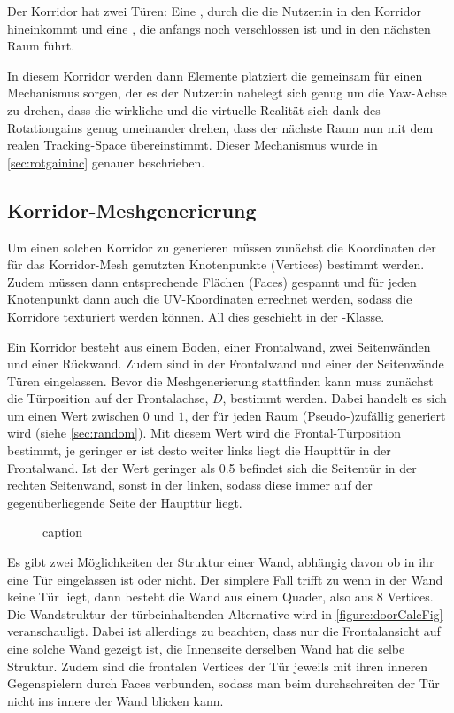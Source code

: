 Der Korridor hat zwei Türen: Eine , durch die die Nutzer:in in den Korridor hineinkommt und eine , die anfangs noch verschlossen ist und in den nächsten Raum führt. %

In diesem Korridor werden dann Elemente platziert die gemeinsam für einen Mechanismus sorgen, der es der Nutzer:in nahelegt sich genug um die Yaw-Achse zu drehen, dass die wirkliche und die virtuelle Realität sich dank des Rotationgains genug umeinander drehen, dass der nächste Raum nun mit dem realen Tracking-Space übereinstimmt. Dieser Mechanismus wurde in
\autoref{sec:rotgaininc}
genauer beschrieben.

\subsection{Korridor-Meshgenerierung}
\label{subsec:corridormesh}
Um einen solchen Korridor zu generieren müssen zunächst die Koordinaten der  für das Korridor-Mesh genutzten Knotenpunkte (Vertices) bestimmt werden. Zudem müssen dann entsprechende Flächen (Faces) gespannt und für jeden Knotenpunkt dann auch die UV-Koordinaten errechnet werden, sodass die Korridore texturiert werden können. All dies geschieht in der -Klasse.

Ein Korridor besteht aus einem Boden, einer Frontalwand, zwei Seitenwänden und einer Rückwand. Zudem sind in der Frontalwand und einer der Seitenwände Türen eingelassen.
Bevor die Meshgenerierung stattfinden kann muss zunächst die Türposition auf der Frontalachse, $D$, bestimmt werden. Dabei handelt es sich um einen Wert zwischen $0$ und $1$, der für jeden Raum (Pseudo-)zufällig generiert wird (siehe \autoref{sec:random}). Mit diesem Wert wird die Frontal-Türposition bestimmt, je geringer er ist desto weiter links liegt die Haupttür in der Frontalwand. Ist der Wert geringer als 0.5 befindet sich die Seitentür in der rechten Seitenwand, sonst in der linken, sodass diese immer auf der gegenüberliegende Seite der Haupttür liegt.

\begin{figure}[H]
    \centering
    
    \caption{caption} %
    \label{figure:doorCalcFig}
\end{figure}


Es gibt zwei Möglichkeiten der Struktur einer Wand, abhängig davon ob in ihr eine Tür eingelassen ist oder nicht. Der simplere Fall trifft zu wenn in der Wand keine Tür liegt, dann besteht die Wand aus einem Quader, also aus 8 Vertices.
Die Wandstruktur der türbeinhaltenden Alternative wird in \autoref{figure:doorCalcFig}
veranschauligt. Dabei ist allerdings zu beachten, dass nur die Frontalansicht auf eine solche Wand gezeigt ist, die Innenseite derselben Wand hat die selbe Struktur. Zudem sind die frontalen Vertices der Tür jeweils mit ihren inneren Gegenspielern durch Faces verbunden, sodass man beim durchschreiten der Tür nicht ins innere der Wand blicken kann.

